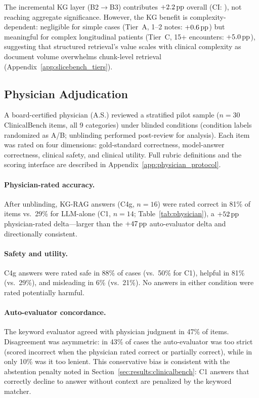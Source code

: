The incremental KG layer (B2$\rightarrow$B3) contributes $+2.2\,\text{pp}$ overall (CI: \ci{-1.5\pp}{+5.9\pp}), not reaching aggregate significance.
However, the KG benefit is complexity-dependent: negligible for simple cases (Tier~A, 1--2 notes: $+0.6\,\text{pp}$) but meaningful for complex longitudinal patients (Tier~C, 15+ encounters: $+5.0\,\text{pp}$), suggesting that structured retrieval's value scales with clinical complexity as document volume overwhelms chunk-level retrieval (Appendix~\ref{app:slicebench_tiers}).

\subsection{Physician Adjudication}
\label{sec:results:physician}

A board-certified physician (A.S.) reviewed a stratified pilot sample ($n=30$ ClinicalBench items, all 9 categories) under blinded conditions (condition labels randomized as A/B; unblinding performed post-review for analysis).
Each item was rated on four dimensions: gold-standard correctness, model-answer correctness, clinical safety, and clinical utility.
Full rubric definitions and the scoring interface are described in Appendix~\ref{app:physician_protocol}.

\paragraph{Physician-rated accuracy.}
After unblinding, KG-RAG answers (C4g, $n=16$) were rated correct in 81\% of items vs.\ 29\% for LLM-alone (C1, $n=14$; Table~\ref{tab:physician}), a $+52\,\text{pp}$ physician-rated delta---larger than the $+47\,\text{pp}$ auto-evaluator delta and directionally consistent.

\paragraph{Safety and utility.}
C4g answers were rated safe in 88\% of cases (vs.\ 50\% for C1), helpful in 81\% (vs.\ 29\%), and misleading in 6\% (vs.\ 21\%).
No answers in either condition were rated potentially harmful.

\paragraph{Auto-evaluator concordance.}
The keyword evaluator agreed with physician judgment in 47\% of items.
Disagreement was asymmetric: in 43\% of cases the auto-evaluator was too strict (scored incorrect when the physician rated correct or partially correct), while in only 10\% was it too lenient.
This conservative bias is consistent with the abstention penalty noted in Section~\ref{sec:results:clinicalbench}: C1 answers that correctly decline to answer without context are penalized by the keyword matcher.

